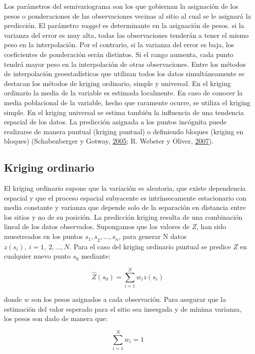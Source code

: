 \documentclass[11pt,b5paper,]{krantz}
\begin{document}
Los parámetros del semivariograma son los que gobiernan la asignación de
los pesos o ponderaciones de las observaciones vecinas al sitio al cual
se le asignará la predicción. El parámetro \emph{nugget} es determinante
en la asignación de pesos. si la varianza del error es muy alta, todas
las observaciones tenderán a tener el mismo peso en la interpolación.
Por el contrario, si la varianza del error es baja, los coeficientes de
ponderación serán distintos. Si el rango aumenta, cada punto tendrá
mayor peso en la interpolación de otras observaciones. Entre los métodos
de interpolación geoestadísticos que utilizan todos los datos
simultáneamente se destacan los métodos de kriging ordinario, simple y
universal. En el kriging ordinario la media de la variable es estimada
localmente. En caso de conocer la media poblacional de la variable,
hecho que raramente ocurre, se utiliza el kriging simple. En el kriging
universal se estima también la influencia de una tendencia espacial de
los datos. La predicción asignada a los puntos incógnita puede
realizarse de manera puntual (kriging puntual) o definiendo bloques
(kriging en bloques) (Schabenberger y Gotway,
\protect\hyperlink{ref-Schabenberger_Gotway_2005}{2005}; R. Webster y
Oliver, \protect\hyperlink{ref-Webster_Oliver_2007}{2007}).

\subsection{Kriging ordinario}\label{kriging-ordinario}

El kriging ordinario supone que la variación es aleatoria, que existe
dependencia espacial y que el proceso espacial subyacente es
intrínsecamente estacionario con media constante y varianza que depende
solo de la separación en distancia entre los sitios y no de su posición.
La predicción kriging resulta de una combinación lineal de los datos
observados. Supongamos que los valores de \(Z\), han sido muestreados en
los puntos \(s_1{,s}_2,\ldots,s_n\), para generar N datos
\(z(s_i),\ i=1,\ 2,\ldots, N\). Para el caso del kriging ordinario
puntual se predice \(Z\) en cualquier nuevo punto \(s_0\) mediante:

\[\hat{Z}(s_0)=\sum_{i=1}^{N}{w_iz(s_i)}\]

donde \(w\) son los pesos asignados a cada observación. Para asegurar
que la estimación del valor esperado para el sitio sea insesgada y de
mínima varianza, los pesos son dado de manera que:

\[\sum_{i = 1}^{N}{w_i=1}\]
\end{document}
